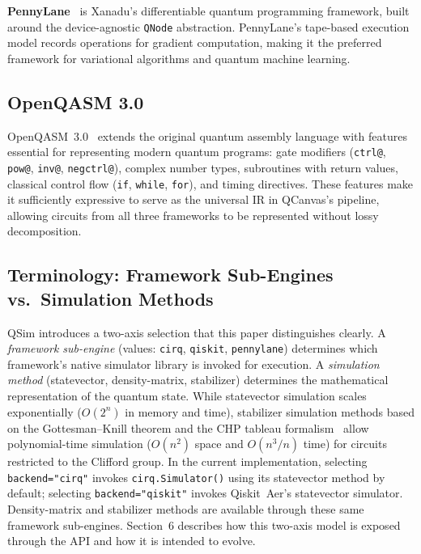 \documentclass[runningheads]{llncs}
\begin{document}
\textbf{PennyLane}~\cite{bergholm2022} is Xanadu's differentiable quantum programming framework, built around the device-agnostic \texttt{QNode} abstraction. PennyLane's tape-based execution model records operations for gradient computation, making it the preferred framework for variational algorithms and quantum machine learning.

\subsection{OpenQASM 3.0}

OpenQASM~3.0~\cite{cross2022} extends the original quantum assembly language with features essential for representing modern quantum programs: gate modifiers (\texttt{ctrl@}, \texttt{pow@}, \texttt{inv@}, \texttt{negctrl@}), complex number types, subroutines with return values, classical control flow (\texttt{if}, \texttt{while}, \texttt{for}), and timing directives. These features make it sufficiently expressive to serve as the universal IR in QCanvas's pipeline, allowing circuits from all three frameworks to be represented without lossy decomposition.

\subsection{Terminology: Framework Sub-Engines vs.\ Simulation Methods}

QSim introduces a two-axis selection that this paper distinguishes clearly. A \textit{framework sub-engine} (values: \texttt{cirq}, \texttt{qiskit}, \texttt{pennylane}) determines which framework's native simulator library is invoked for execution. A \textit{simulation method} (statevector, density-matrix, stabilizer) determines the mathematical representation of the quantum state. While statevector simulation scales exponentially ($O(2^n)$ in memory and time), stabilizer simulation methods based on the Gottesman--Knill theorem and the CHP tableau formalism~\cite{aaronson2004} allow polynomial-time simulation ($O(n^2)$ space and $O(n^3 / n)$ time) for circuits restricted to the Clifford group. In the current implementation, selecting \texttt{backend="cirq"} invokes \texttt{cirq.Simulator()} using its statevector method by default; selecting \texttt{backend="qiskit"} invokes Qiskit~Aer's statevector simulator. Density-matrix and stabilizer methods are available through these same framework sub-engines. Section~6 describes how this two-axis model is exposed through the API and how it is intended to evolve.
\end{document}
